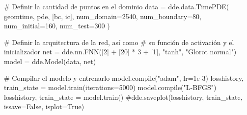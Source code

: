 \documentclass[
  spanish,
  us-letterpaper,
  DIV=11,
  numbers=noendperiod]{scrreprt}
\newenvironment{Shaded}{\begin{snugshade}}{\end{snugshade}}
\newcommand{\BuiltInTok}[1]{\textcolor[rgb]{0.00,0.23,0.31}{#1}}
\newcommand{\CommentTok}[1]{\textcolor[rgb]{0.37,0.37,0.37}{#1}}
\newcommand{\DecValTok}[1]{\textcolor[rgb]{0.68,0.00,0.00}{#1}}
\newcommand{\FloatTok}[1]{\textcolor[rgb]{0.68,0.00,0.00}{#1}}
\newcommand{\NormalTok}[1]{\textcolor[rgb]{0.00,0.23,0.31}{#1}}
\newcommand{\OperatorTok}[1]{\textcolor[rgb]{0.37,0.37,0.37}{#1}}
\newcommand{\StringTok}[1]{\textcolor[rgb]{0.13,0.47,0.30}{#1}}
\theoremstyle{plain}
\theoremstyle{definition}
\theoremstyle{remark}
\begin{document}
\begin{Shaded}
\begin{Highlighting}[]
\CommentTok{\# Definir la cantidad de puntos en el dominio}
\NormalTok{data }\OperatorTok{=}\NormalTok{ dde.data.TimePDE(}
\NormalTok{    geomtime, pde, [bc, ic],}
\NormalTok{    num\_domain}\OperatorTok{=}\DecValTok{2540}\NormalTok{,}
\NormalTok{    num\_boundary}\OperatorTok{=}\DecValTok{80}\NormalTok{,}
\NormalTok{    num\_initial}\OperatorTok{=}\DecValTok{160}\NormalTok{,}
\NormalTok{    num\_test}\OperatorTok{=}\DecValTok{300}
\NormalTok{)}

\CommentTok{\# Definir la arquitectura de la red, así como}
\CommentTok{\# su función de activación y el inicializador}
\NormalTok{net }\OperatorTok{=}\NormalTok{ dde.nn.FNN([}\DecValTok{2}\NormalTok{] }\OperatorTok{+}\NormalTok{ [}\DecValTok{20}\NormalTok{] }\OperatorTok{*} \DecValTok{3} \OperatorTok{+}\NormalTok{ [}\DecValTok{1}\NormalTok{], }\StringTok{"tanh"}\NormalTok{, }\StringTok{"Glorot normal"}\NormalTok{)}
\NormalTok{model }\OperatorTok{=}\NormalTok{ dde.Model(data, net)}

\CommentTok{\# Compilar el modelo y entrenarlo}
\NormalTok{model.}\BuiltInTok{compile}\NormalTok{(}\StringTok{"adam"}\NormalTok{, lr}\OperatorTok{=}\FloatTok{1e{-}3}\NormalTok{)}
\NormalTok{losshistory, train\_state }\OperatorTok{=}\NormalTok{ model.train(iterations}\OperatorTok{=}\DecValTok{5000}\NormalTok{)}
\NormalTok{model.}\BuiltInTok{compile}\NormalTok{(}\StringTok{"L{-}BFGS"}\NormalTok{)}
\NormalTok{losshistory, train\_state }\OperatorTok{=}\NormalTok{ model.train()}
\CommentTok{\#dde.saveplot(losshistory, train\_state, issave=False, isplot=True)}
\end{Highlighting}
\end{Shaded}
\end{document}

